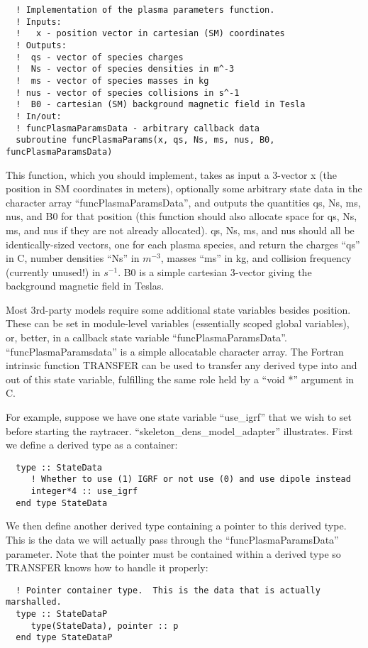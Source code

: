 \documentclass[10pt]{article}
\begin{document}
\begin{verbatim}
  ! Implementation of the plasma parameters function.
  ! Inputs:
  !   x - position vector in cartesian (SM) coordinates
  ! Outputs:
  !  qs - vector of species charges
  !  Ns - vector of species densities in m^-3
  !  ms - vector of species masses in kg
  ! nus - vector of species collisions in s^-1
  !  B0 - cartesian (SM) background magnetic field in Tesla
  ! In/out:
  ! funcPlasmaParamsData - arbitrary callback data 
  subroutine funcPlasmaParams(x, qs, Ns, ms, nus, B0, funcPlasmaParamsData)
\end{verbatim}

This function, which you should implement, takes as input a 3-vector x
(the position in SM coordinates in meters), optionally some arbitrary
state data in the character array ``funcPlasmaParamsData'', and
outputs the quantities qs, Ns, ms, nus, and B0 for that position (this
function should also allocate space for qs, Ns, ms, and nus if they
are not already allocated).  qs, Ns, ms, and nus should all be
identically-sized vectors, one for each plasma species, and return the
charges ``qs'' in C, number densities ``Ns'' in $m^{-3}$, masses
``ms'' in kg, and collision frequency (currently unused!) in $s^{-1}$.
B0 is a simple cartesian 3-vector giving the background magnetic field
in Teslas.

Most 3rd-party models require some additional state variables besides
position.  These can be set in module-level variables (essentially
scoped global variables), or, better, in a callback state variable
``funcPlasmaParamsData''.  ``funcPlasmaParamsdata'' is a simple
allocatable character array.  The Fortran intrinsic function TRANSFER
can be used to transfer any derived type into and out of this state
variable, fulfilling the same role held by a ``void *'' argument in C.

For example, suppose we have one state variable ``use\_igrf'' that we
wish to set before starting the raytracer.
``skeleton\_dens\_model\_adapter'' illustrates.  First we define a
derived type as a container:
\begin{verbatim}
  type :: StateData
     ! Whether to use (1) IGRF or not use (0) and use dipole instead
     integer*4 :: use_igrf
  end type StateData
\end{verbatim}

We then define another derived type containing a pointer to this
derived type.  This is the data we will actually pass through the
``funcPlasmaParamsData'' parameter.  Note that the pointer must be
contained within a derived type so TRANSFER knows how to handle it
properly:
\begin{verbatim}
  ! Pointer container type.  This is the data that is actually marshalled.
  type :: StateDataP 
     type(StateData), pointer :: p
  end type StateDataP
\end{verbatim}
\end{document}
